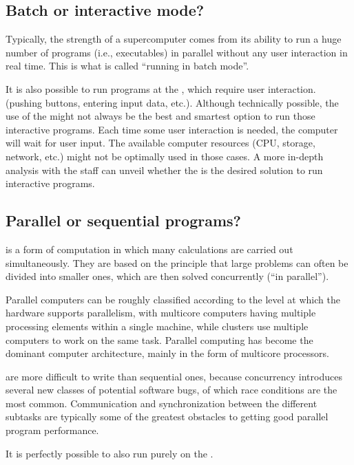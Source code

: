 \subsection{Batch or interactive mode?}
\label{sec:batch-or-interactive-mode}

Typically, the strength of a supercomputer comes from its ability to run a huge
number of programs (i.e., executables) in parallel without any user interaction
in real time. This is what is called ``running in batch mode''.

It is also possible to run programs at the \hpc, which require user
interaction. (pushing buttons, entering input data, etc.).  Although
technically possible, the use of the \hpc might not always be the best and
smartest option to run those interactive programs.  Each time some user
interaction is needed, the computer will wait for user input. The available
computer resources (CPU, storage, network, etc.) might not be optimally used in
those cases. A more in-depth analysis with the \hpc staff can unveil whether
the \hpc is the desired solution to run interactive programs.

\subsection{Parallel or sequential programs?}
\label{sec:parallel-or-sequential-programs}

 is a form of computation in which many calculations
are carried out simultaneously. They are based on the principle that large
problems can often be divided into smaller ones, which are then solved
concurrently (``in parallel'').

Parallel computers can be roughly classified according to the level at which
the hardware supports parallelism, with multicore computers having multiple
processing elements within a single machine, while clusters use multiple
computers to work on the same task. Parallel computing has become the dominant
computer architecture, mainly in the form of multicore processors.

 are more difficult to write than sequential ones,
because concurrency introduces several new classes of potential software bugs,
of which race conditions are the most common. Communication and synchronization
between the different subtasks are typically some of the greatest obstacles to
getting good parallel program performance.

It is perfectly possible to also run purely  on the
\hpc.

